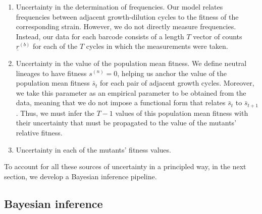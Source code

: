 \documentclass[
  letterpaper,
  DIV=11,
  numbers=noendperiod]{scrartcl}
\providecommand{\tightlist}{%
  \setlength{\itemsep}{0pt}\setlength{\parskip}{0pt}}\usepackage{longtable,booktabs,array}
\begin{document}
\begin{refsegment}
\begin{enumerate}
\def\labelenumi{\arabic{enumi}.}
\tightlist
\item
  Uncertainty in the determination of frequencies. Our model relates
  frequencies between adjacent growth-dilution cycles to the fitness of
  the corresponding strain. However, we do not directly measure
  frequencies. Instead, our data for each barcode consists of a length
  \(T\) vector of counts \(\underline{r}^{(b)}\) for each of the \(T\)
  cycles in which the measurements were taken.
\item
  Uncertainty in the value of the population mean fitness. We define
  neutral lineages to have fitness \(s^{(n)} = 0\), helping us anchor
  the value of the population mean fitness \(\bar{s}_t\) for each pair
  of adjacent growth cycles. Moreover, we take this parameter as an
  empirical parameter to be obtained from the data, meaning that we do
  not impose a functional form that relates \(\bar{s}_t\) to
  \(\bar{s}_{t+1}\). Thus, we must infer the \(T-1\) values of this
  population mean fitness with their uncertainty that must be propagated
  to the value of the mutants' relative fitness.
\item
  Uncertainty in each of the mutants' fitness values.
\end{enumerate}

To account for all these sources of uncertainty in a principled way, in
the next section, we develop a Bayesian inference pipeline.

\hypertarget{sec-bayesian_inference}{%
\subsection{Bayesian inference}\label{sec-bayesian_inference}}


\end{refsegment}
\end{document}
